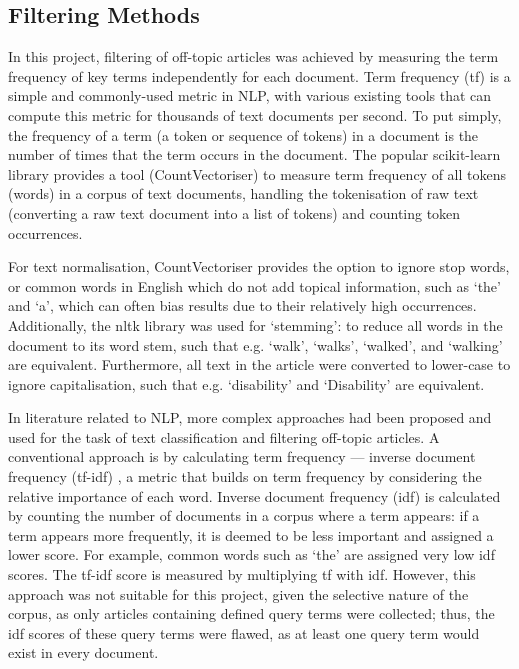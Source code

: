 \documentclass{report}
\begin{document}
\subsection{Filtering Methods} \label{tc-filtering}
In this project, filtering of off-topic articles was achieved by measuring the term frequency of key terms independently for each document.
Term frequency (tf) is a simple and commonly-used metric in NLP, with various existing tools that can compute this metric for thousands of text documents per second.
To put simply, the frequency of a term (a token or sequence of tokens) in a document is the number of times that the term occurs in the document.
The popular scikit-learn library \cite{Scikit-learn} provides a tool (CountVectoriser) to measure term frequency of all tokens (words) in a corpus of text documents, handling the tokenisation of raw text (converting a raw text document into a list of tokens) and counting token occurrences.

For text normalisation, CountVectoriser provides the option to ignore stop words, or common words in English which do not add topical information, such as `the' and `a', which can often bias results due to their relatively high occurrences.
Additionally, the nltk library \cite{Nltk} was used for `stemming': to reduce all words in the document to its word stem, such that e.g. `walk', `walks', `walked', and `walking' are equivalent.
Furthermore, all text in the article were converted to lower-case to ignore capitalisation, such that e.g. `disability' and `Disability' are equivalent.

In literature related to NLP, more complex approaches had been proposed and used for the task of text classification and filtering off-topic articles.
A conventional approach is by calculating term frequency --- inverse document frequency (tf-idf) \cite{robertson2004understanding, sparck1972statistical}, a metric that builds on term frequency by considering the relative importance of each word.
Inverse document frequency (idf) is calculated by counting the number of documents in a corpus where a term appears: if a term appears more frequently, it is deemed to be less important and assigned a lower score.
For example, common words such as `the' are assigned very low idf scores.
The tf-idf score is measured by multiplying tf with idf.
However, this approach was not suitable for this project, given the selective nature of the corpus, as only articles containing defined query terms were collected; thus, the idf scores of these query terms were flawed, as at least one query term would exist in every document.
\end{document}
